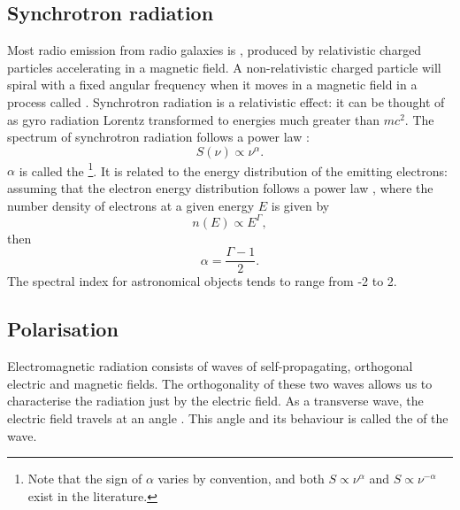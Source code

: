     \subsection{Synchrotron radiation}
    \label{sec:synchrotron}

        Most radio emission from radio galaxies is , produced by relativistic charged particles accelerating in a magnetic field. A non-relativistic charged particle will spiral with a fixed angular frequency when it moves in a magnetic field in a process called . Synchrotron radiation is a relativistic effect: it can be thought of as gyro radiation Lorentz transformed to energies much greater than $mc^2$. The spectrum of synchrotron radiation follows a power law \citep{condon_essential_2016}:
        \begin{equation}
            \label{eq:spectral-index}
            S(\nu) \propto \nu^{\alpha}.
        \end{equation}
        $\alpha$ is called the \footnote{Note that the sign of $\alpha$ varies by convention, and both $S \propto \nu^{\alpha}$ and $S \propto \nu^{-\alpha}$ exist in the literature.}. It is related to the energy distribution of the emitting electrons: assuming that the electron energy distribution follows a power law \citep[which it generally does,][]{rybicki_radiative_2008}, where the number density of electrons at a given energy $E$ is given by
        \begin{equation}
            n(E) \propto E^\Gamma,
        \end{equation}
        then
        \begin{equation}
            \alpha = \frac{\Gamma - 1}{2}.
        \end{equation}
        The spectral index for astronomical objects tends to range from -2 to 2\citeneeded.

    \subsection{Polarisation}
    \label{sec:polarisation}

        Electromagnetic radiation consists of waves of self-propagating, orthogonal electric and magnetic fields. The orthogonality of these two waves allows us to characterise the radiation just by the electric field. As a transverse wave, the electric field travels at an angle . This angle and its behaviour is called the  of the wave.

